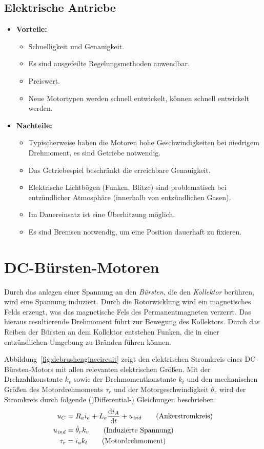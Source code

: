 		\subsection{Elektrische Antriebe}
			\begin{itemize}
				\item \textbf{Vorteile:}
					\begin{itemize}
						\item Schnelligkeit und Genauigkeit.
						\item Es sind ausgefeilte Regelungsmethoden anwendbar.
						\item Preiswert.
						\item Neue Motortypen werden schnell entwickelt, \bzw können schnell entwickelt werden.
					\end{itemize}
				\item \textbf{Nachteile:}
					\begin{itemize}
						\item Typischerweise haben die Motoren hohe Geschwindigkeiten bei niedrigem Drehmoment, \dh es sind Getriebe notwendig.
						\item Das Getriebespiel beschränkt die erreichbare Genauigkeit.
						\item Elektrische Lichtbögen (Funken, Blitze) sind problematisch bei entzündlicher Atmosphäre (\zB innerhalb von entzündlichen Gasen).
						\item Im Dauereinsatz ist eine Überhitzung möglich.
						\item Es sind Bremsen notwendig, um eine Position dauerhaft zu fixieren.
					\end{itemize}
			\end{itemize}

	\section{DC-Bürsten-Motoren}
		Durch das anlegen einer Spannung an den \emph{Bürsten}, die den \emph{Kollektor} berühren, wird eine Spannung induziert. Durch die Rotorwicklung wird ein magnetisches Felds erzeugt, was das magnetische Fels des Permanentmagneten verzerrt. Das hieraus resultierende Drehmoment führt zur Bewegung des Kollektors. Durch das Reiben der Bürsten an dem Kollektor entstehen Funken, die in einer entzündlichen Umgebung zu Bränden führen können.

		Abbildung~\ref{fig:dcbrushenginecircuit} zeigt den elektrischen Stromkreis eines DC-Bürsten-Motors mit allen relevanten elektrischen Größen. Mit der Drehzahlkonstante \(k_v\) sowie der Drehmomentkonstante \(k_t\) und den mechanischen Größen des Motordrehmoments \(\tau_r\) und der Motorgeschwindigkeit \(\dot{\theta}_r\) wird der Stromkreis durch folgende ()Differential-) Gleichungen beschrieben:
		\begin{align*}
			u_C            & = R_a i_a + L_a \dv{i_A}{t} + u_\mathit{ind} \tag{Ankerstromkreis}     \\
			u_\mathit{ind} & = \dot{\theta}_r k_v                         \tag{Induzierte Spannung} \\
			\tau_r         & = i_a k_t                                    \tag{Motordrehmoment}
		\end{align*}

